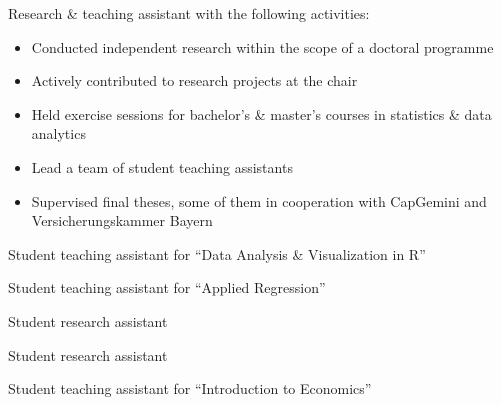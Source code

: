 \documentclass[10pt,a4paper,withhyper]{altacv}
\begin{document}
\begin{paracol}{2}


\newpage


Research \& teaching assistant with the following activities:
\smallskip
\begin{itemize}
\item Conducted independent research within the scope of a doctoral programme
\item Actively contributed to research projects at the chair
\item Held exercise sessions for bachelor's \& master's courses in statistics \& data analytics
\item Lead a team of student teaching assistants
\item Supervised final theses, some of them in cooperation with CapGemini and Versicherungskammer Bayern
\end{itemize}

\divider

Student teaching assistant for ``Data Analysis \& Visualization in R''

\divider

Student teaching assistant for ``Applied Regression''

\divider

Student research assistant

\divider

Student research assistant

\divider

Student teaching assistant for ``Introduction to Economics''




\end{paracol}
\end{document}
